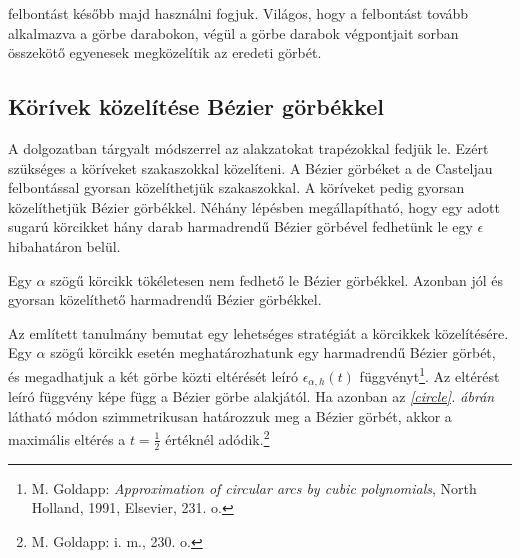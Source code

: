 \documentclass[12pt]{report}
\theoremstyle{definition}
\begin{document}
 felbontást később majd használni fogjuk. Világos, hogy a felbontást
tovább alkalmazva a görbe darabokon, végül a görbe darabok végpontjait sorban
összekötő egyenesek megközelítik az eredeti görbét.

    \subsection*{Körívek közelítése Bézier görbékkel}
    \label{}

A dolgozatban tárgyalt módszerrel az alakzatokat trapézokkal fedjük le. Ezért
szükséges a köríveket szakaszokkal közelíteni. A Bézier görbéket a de Casteljau
felbontással gyorsan közelíthetjük szakaszokkal. A köríveket pedig gyorsan
közelíthetjük Bézier görbékkel. Néhány lépésben megállapítható, hogy egy adott
sugarú körcikket hány darab harmadrendű Bézier görbével fedhetünk le egy
$\epsilon$ hibahatáron belül.

Egy $\alpha$ szögű körcikk tökéletesen nem fedhető le Bézier
görbékkel\cite[Goldapp]{Goldapp:1991:approximation}. Azonban jól és gyorsan
közelíthető harmadrendű Bézier görbékkel.

Az említett \cite[Goldapp]{Goldapp:1991:approximation} tanulmány bemutat egy
lehetséges stratégiát a körcikkek közelítésére. Egy $\alpha$ szögű körcikk
esetén meghatározhatunk egy harmadrendű Bézier görbét, és megadhatjuk a két
görbe közti eltérését leíró $\epsilon_{\alpha,h}(t)$ függvényt\footnote{M.
Goldapp: \emph{Approximation of circular arcs by cubic polynomials}, North
Holland, 1991, Elsevier, 231. o.}. Az eltérést leíró függvény képe függ a
Bézier görbe alakjától. Ha azonban az \emph{\ref{circle}. ábrán} látható módon
szimmetrikusan határozzuk meg a Bézier görbét, akkor a maximális eltérés a
$t=\frac{1}{2}$ értéknél adódik.\footnote{M. Goldapp: i. m., 230. o.}
\end{document}
